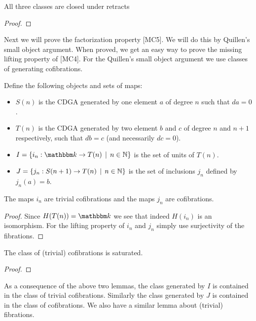 \begin{lemma}
	[MC3] All three classes are closed under retracts
\end{lemma}
\begin{proof}
\end{proof}

Next we will prove the factorization property [MC5]. We will do this by Quillen's small object argument. When proved, we get an easy way to prove the missing lifting property of [MC4]. For the Quillen's small object argument we use classes of generating cofibrations.

\begin{definition}
	Define the following objects and sets of maps:
	\begin{itemize}
		\item $S(n)$ is the CDGA generated by one element $a$ of degree $n$ such that $da = 0$.
		\item $T(n)$ is the CDGA generated by two element $b$ and $c$ of degree $n$ and $n+1$ respectively, such that $db = c$ (and necessarily $dc = 0$).
		\item $I = \{ i_n: \k \to T(n) \I n \in \N \}$ is the set of units of $T(n)$.
		\item $J = \{ j_n: S(n+1) \to T(n) \,\mid\, n \in \mathbb{N} \}$ is the set of inclusions $j_n$ defined by $j_n(a) = b$.
	\end{itemize}
\end{definition}

\begin{lemma}
	The maps $i_n$ are trivial cofibrations and the maps $j_n$ are cofibrations.
\end{lemma}
\begin{proof}
	Since $H(T(n)) = \k$  we see that indeed $H(i_n)$ is an isomorphism. For the lifting property of $i_n$ and $j_n$ simply use surjectivity of the fibrations. 
\end{proof}

\begin{lemma}
	The class of (trivial) cofibrations is saturated.
\end{lemma}
\begin{proof}
\end{proof}

As a consequence of the above two lemmas, the class generated by $I$ is contained in the class of trivial cofibrations. Similarly the class generated by $J$ is contained in the class of cofibrations. We also have a similar lemma about (trivial) fibrations.

